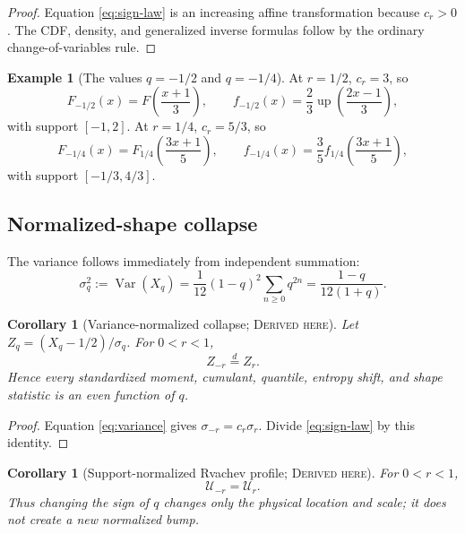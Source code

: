 \documentclass[11pt,oneside]{article}
\newtheorem{corollary}[theorem]{Corollary}
\theoremstyle{definition}
\newtheorem{example}[theorem]{Example}
\theoremstyle{remark}
\newcommand{\Var}{\operatorname{Var}}
\newcommand{\Up}{\operatorname{up}}
\newcommand{\Derived}{\textsc{Derived here}}
\begin{document}
\begin{proof}
Equation \eqref{eq:sign-law} is an increasing affine transformation because
\(c_r>0\).  The CDF, density, and generalized inverse formulas follow by the
ordinary change-of-variables rule.
\end{proof}

\begin{example}[The values \(q=-1/2\) and \(q=-1/4\)]
At \(r=1/2\), \(c_r=3\), so
\begin{equation}\label{eq:minus-half-up}
 F_{-1/2}(x)=F\!\left(\frac{x+1}{3}\right),\qquad
 f_{-1/2}(x)=\frac23\Up\!\left(\frac{2x-1}{3}\right),
\end{equation}
with support \([-1,2]\).  At \(r=1/4\), \(c_r=5/3\), so
\begin{equation}\label{eq:minus-quarter}
 F_{-1/4}(x)=F_{1/4}\!\left(\frac{3x+1}{5}\right),\qquad
 f_{-1/4}(x)=\frac35f_{1/4}\!\left(\frac{3x+1}{5}\right),
\end{equation}
with support \([-1/3,4/3]\).
\end{example}

\subsection{Normalized-shape collapse}
The variance follows immediately from independent summation:
\begin{equation}\label{eq:variance}
 \sigma_q^2:=\Var(X_q)
 =\frac1{12}(1-q)^2\sum_{n\ge0}q^{2n}
 =\frac{1-q}{12(1+q)}.
\end{equation}

\begin{corollary}[Variance-normalized collapse; \Derived]\label{cor:standard-collapse}
Let \(Z_q=(X_q-1/2)/\sigma_q\).  For \(0<r<1\),
\begin{equation}\label{eq:standard-collapse}
 Z_{-r}\stackrel d=Z_r.
\end{equation}
Hence every standardized moment, cumulant, quantile, entropy shift, and shape
statistic is an even function of \(q\).
\end{corollary}

\begin{proof}
Equation \eqref{eq:variance} gives \(\sigma_{-r}=c_r\sigma_r\).  Divide
\eqref{eq:sign-law} by this identity.
\end{proof}

\begin{corollary}[Support-normalized Rvachev profile; \Derived]
For \(0<r<1\),
\begin{equation}\label{eq:profile-collapse}
 \mathcal U_{-r}=\mathcal U_r.
\end{equation}
Thus changing the sign of \(q\) changes only the physical location and scale;
it does not create a new normalized bump.
\end{corollary}
\end{document}

